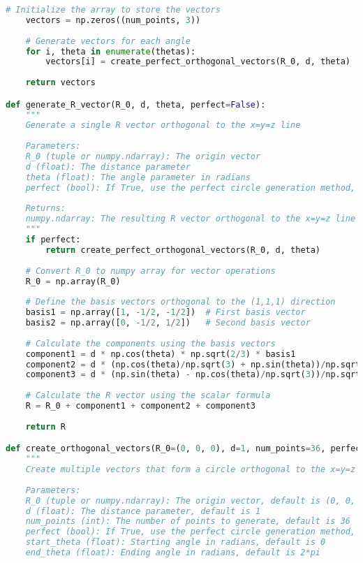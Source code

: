 \begin{lstlisting}[language=Python]
    # Initialize the array to store the vectors
    vectors = np.zeros((num_points, 3))
    
    # Generate vectors for each angle
    for i, theta in enumerate(thetas):
        vectors[i] = create_perfect_orthogonal_vectors(R_0, d, theta)
    
    return vectors

def generate_R_vector(R_0, d, theta, perfect=False):
    """
    Generate a single R vector orthogonal to the x=y=z line
    
    Parameters:
    R_0 (tuple or numpy.ndarray): The origin vector
    d (float): The distance parameter
    theta (float): The angle parameter in radians
    perfect (bool): If True, use the perfect circle generation method, default is False
    
    Returns:
    numpy.ndarray: The resulting R vector orthogonal to the x=y=z line
    """
    if perfect:
        return create_perfect_orthogonal_vectors(R_0, d, theta)
    
    # Convert R_0 to numpy array for vector operations
    R_0 = np.array(R_0)
    
    # Define the basis vectors orthogonal to the (1,1,1) direction
    basis1 = np.array([1, -1/2, -1/2])  # First basis vector
    basis2 = np.array([0, -1/2, 1/2])   # Second basis vector
    
    # Calculate the components using the basis vectors
    component1 = d * np.cos(theta) * np.sqrt(2/3) * basis1
    component2 = d * (np.cos(theta)/np.sqrt(3) + np.sin(theta))/np.sqrt(2) * basis1
    component3 = d * (np.sin(theta) - np.cos(theta)/np.sqrt(3))/np.sqrt(2) * basis2 * np.sqrt(2)
    
    # Calculate the R vector using the scalar formula
    R = R_0 + component1 + component2 + component3
    
    return R

def create_orthogonal_vectors(R_0=(0, 0, 0), d=1, num_points=36, perfect=False, start_theta=0, end_theta=2*np.pi):
    """
    Create multiple vectors that form a circle orthogonal to the x=y=z line
    
    Parameters:
    R_0 (tuple or numpy.ndarray): The origin vector, default is (0, 0, 0)
    d (float): The distance parameter, default is 1
    num_points (int): The number of points to generate, default is 36
    perfect (bool): If True, use the perfect circle generation method, default is False
    start_theta (float): Starting angle in radians, default is 0
    end_theta (float): Ending angle in radians, default is 2*pi
    

\end{lstlisting}
